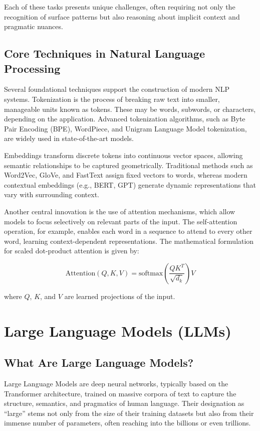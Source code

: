 \documentclass[openany]{book}
\begin{document}
Each of these tasks presents unique challenges, often requiring not only the 
recognition of surface patterns but also reasoning about implicit context and 
pragmatic nuances.

\subsection{Core Techniques in Natural Language Processing}

Several foundational techniques support the construction of modern NLP systems. 
Tokenization is the process of breaking raw text into smaller, manageable units 
known as tokens. These may be words, subwords, or characters, depending on the 
application. Advanced tokenization algorithms, such as Byte Pair Encoding (BPE), 
WordPiece, and Unigram Language Model tokenization, are widely used in 
state-of-the-art models.

Embeddings transform discrete tokens into continuous vector spaces, allowing 
semantic relationships to be captured geometrically. Traditional methods such as 
Word2Vec, GloVe, and FastText assign fixed vectors to words, whereas modern 
contextual embeddings (e.g., BERT, GPT) generate dynamic representations that 
vary with surrounding context.

Another central innovation is the use of attention mechanisms, which allow 
models to focus selectively on relevant parts of the input. The self-attention 
operation, for example, enables each word in a sequence to attend to every other 
word, learning context-dependent representations. The mathematical formulation 
for scaled dot-product attention is given by:

\[
\text{Attention}(Q, K, V) = \text{softmax}\left( \frac{QK^T}{\sqrt{d_k}} 
\right)V
\]

where \(Q\), \(K\), and \(V\) are learned projections of the input.

\section{Large Language Models (LLMs)}

\subsection{What Are Large Language Models?}

Large Language Models are deep neural networks, typically based on the 
Transformer architecture, trained on massive corpora of text to capture the 
structure, semantics, and pragmatics of human language. Their designation as 
``large'' stems not only from the size of their training datasets but also from 
their immense number of parameters, often reaching into the billions or even
 trillions.
\end{document}
